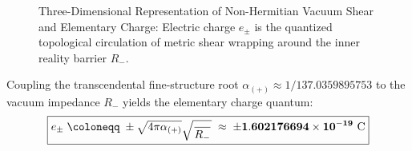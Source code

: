 \documentclass[
    12pt,
    a4paper,
    headings=normal,
    twoside=false,
    open=any,
    parskip=half
]{scrbook}
\let\hbar\relax
\begin{document}
\begin{figure}[htbp]
\caption{Three-Dimensional Representation of Non-Hermitian Vacuum Shear and Elementary Charge: Electric charge $e_\pm$ is the quantized topological circulation of metric shear wrapping around the inner reality barrier $R_-$.}
\label{fig:ch5_charge_shear_3d}
\end{figure}

\begin{phystheorem}\label{thm:ch5_elementary_charge_theorem}
Coupling the transcendental fine-structure root $\alpha_{(+)} \approx 1/137.0359895753$ to the vacuum impedance $R_-$ yields the elementary charge quantum:
\begin{equation}
\boxed{e_\pm \;\coloneqq\; \pm \sqrt{4\pi \alpha_{(+)}} \sqrt{\frac{\hbar}{R_-}} \;\approx\; \pm \mathbf{1.602176694 \times 10^{-19} \text{ C}}}
\label{eq:ch5_elementary_charge_master}
\end{equation}
\end{phystheorem}
\end{document}
